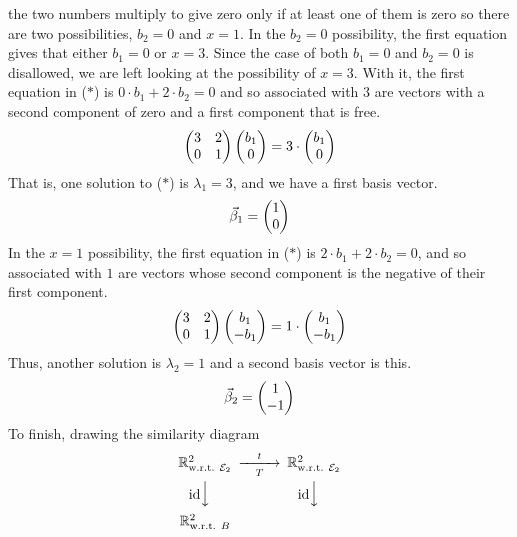 \begin{example}
the two numbers multiply to give zero only if
at least one of them is zero so there are two possibilities,
$b_2=0$ and $x=1$. 
In the \( b_2=0 \) possibility, 
the first equation gives that either $b_1=0$ or \( x=3 \).
Since the case of both $b_1=0$ and $b_2=0$ is disallowed,
we are left looking at the possibility of $x=3$. 
With it, the first equation in ($*$) is $0\cdot b_1+2\cdot b_2=0$
and so associated with $3$ are vectors
with a second component of zero and a first component that is free. 
\begin{equation*}
     \begin{pmatrix}
        3  &2  \\
        0  &1
     \end{pmatrix}
     \begin{pmatrix} b_1 \\ 0 \end{pmatrix}=3\cdot\begin{pmatrix} b_1 \\ 0 \end{pmatrix} 
\end{equation*}
That is, one solution to ($*$) is $\lambda_1=3$, and we have a 
first basis vector.
\begin{equation*}
   \vec{\beta}_1=\begin{pmatrix} 1 \\ 0 \end{pmatrix}
\end{equation*}
In the $x=1$ possibility, 
the first equation in ($*$) is $2\cdot b_1+2\cdot b_2=0$, and so
associated with $1$ are vectors whose 
second component is the negative of their first component.
\begin{equation*}
     \begin{pmatrix}
        3  &2  \\
        0  &1
     \end{pmatrix}
     \begin{pmatrix} b_1 \\ -b_1 \end{pmatrix}=1\cdot\begin{pmatrix} b_1 \\ -b_1 \end{pmatrix} 
\end{equation*}
Thus, another solution is $\lambda_2=1$ and 
a second basis vector is this.
\begin{equation*}
   \vec{\beta}_2=\begin{pmatrix} 1 \\ -1 \end{pmatrix}
\end{equation*}
To finish, drawing the similarity diagram        
\begin{equation*}
     \begin{CD}
            \Re^2_\wrt{\stdbasis_2}                   
               @>t>T>        
               \Re^2_\wrt{\stdbasis_2}       \\
            @V{\scriptstyle\identity} VV                
               @V{\scriptstyle\identity} VV \\
            \Re^2_\wrt{B}         

\end{CD}
\end{equation*}
\end{example}

